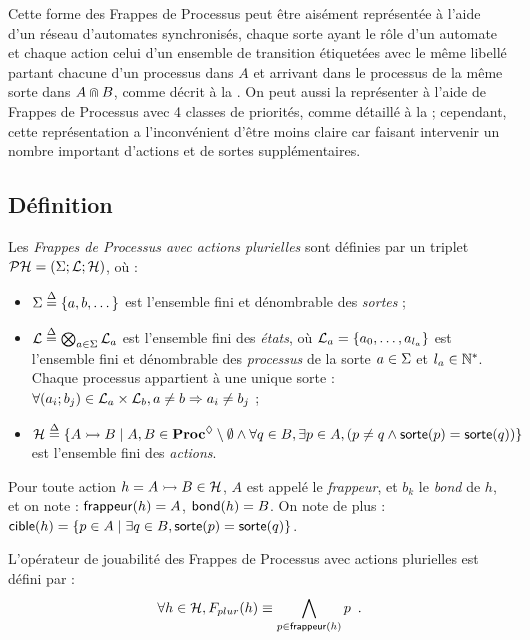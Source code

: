 Cette forme des Frappes de Processus peut être aisément représentée à l'aide d'un réseau
d'automates synchronisés, chaque sorte ayant le rôle d'un automate et chaque action celui d'un
ensemble de transition étiquetées avec le même libellé partant chacune d'un processus dans $A$ et
arrivant dans le processus de la même sorte dans $A \Cap B$,
comme décrit à la .
On peut aussi la représenter à l'aide de Frappes de Processus avec 4 classes de priorités,
comme détaillé à la  ;
cependant, cette représentation a l'inconvénient d'être moins claire car faisant intervenir
un nombre important d'actions et de sortes supplémentaires.



\subsection{Définition}


\begin{definition}
  Les \emph{Frappes de Processus avec actions plurielles} sont définies
  par un triplet $\mathcal{PH} = (\Sigma; \mathcal{L}; \mathcal{H})$, où :
  \begin{itemize}
    \item $\Sigma \stackrel{\Delta}= \{a, b, \dots\}$ est l'ensemble fini et dénombrable des \emph{sortes} ;
    \item $\mathcal{L} \stackrel{\Delta}= \bigotimes_{a \in \Sigma} \mathcal{L}_a$ est l'ensemble fini des \emph{états},
      où $\mathcal{L}_a = \{a_0, \ldots, a_{l_a}\}$ est l'ensemble fini et dénombrable
      des \emph{processus} de la sorte $a \in \Sigma$ et $l_a \in \mathbb{N}^*$.
      Chaque processus appartient à une unique sorte :
      $\forall (a_i; b_j) \in \mathcal{L}_a \times \mathcal{L}_b, a \neq b \Rightarrow a_i \neq b_j$ ;
    \item $\mathcal{H} \stackrel{\Delta}= \{\mbox{$A \rightarrowtail B$} \mid A, B \in \mathbf{Proc}^{\lozenge} \setminus \emptyset \wedge
      \forall q \in B, \exists p \in A, (p \neq q \wedge \mathsf{sorte}(p) = \mathsf{sorte}(q)) \}$
      est l'ensemble fini des \emph{actions}.
  \end{itemize}
\end{definition}
%
\noindent
Pour toute action $h = \mbox{$A \rightarrowtail B$} \in \mathcal{H}$,
$A$ est appelé le \emph{frappeur}, et $b_k$ le \emph{bond} de $h$,
et on note : $\mathsf{frappeur}(h) = A$, $\mathsf{bond}(h) = B$.
On note de plus :
$\mathsf{cible}(h) = \{ p \in A \mid \exists q \in B, \mathsf{sorte}(p) = \mathsf{sorte}(q) \}$.

\begin{definition}
  L'opérateur de jouabilité des Frappes de Processus avec actions plurielles est défini par :
  \[\forall h \in \mathcal{H}, F_{plur}(h) \equiv \bigwedge_{p \in \mathsf{frappeur}(h)} p \enspace.\]
\end{definition}



